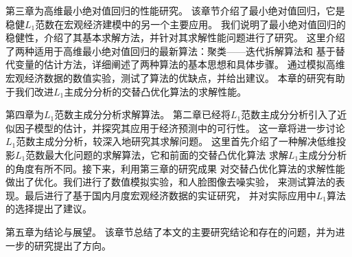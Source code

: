 第三章为高维最小绝对值回归的性能研究。
该章节介绍了最小绝对值回归，它是稳健$L_1$范数在宏观经济建模中的另一个主要应用。
我们说明了最小绝对值回归的稳健性，介绍了其基本求解方法，并针对其求解性能问题进行了研究。
这里介绍了两种适用于高维最小绝对值回归的最新算法：聚类——迭代拆解算法和
基于替代变量的估计方法，详细阐述了两种算法的基本思想和具体步骤。
通过模拟高维宏观经济数据的数值实验，测试了算法的优缺点，并给出建议。
本章的研究有助于我们改进$L_1$主成分分析的交替凸优化算法的求解性能。

第四章为$L_1$范数主成分分析求解算法。
第二章已经将$L_1$范数主成分分析引入了近似因子模型的估计，并探究其应用于经济预测中的可行性。
这一章将进一步讨论$L_1$范数主成分分析，较深入地研究其求解问题。
这里首先介绍了一种解决低维投影$L_1$范数最大化问题的求解算法，它和前面的交替凸优化算法
求解$L_1$主成分分析的角度有所不同。接下来，利用第三章的研究成果
对交替凸优化算法的求解性能做出了优化。我们进行了数值模拟实验，和人脸图像去噪实验，
来测试算法的表现。最后进行了基于国内月度宏观经济数据的实证研究，
并对实际应用中$L_1$算法的选择提出了建议。

第五章为结论与展望。
该章节总结了本文的主要研究结论和存在的问题，并为进一步的研究提出了方向。
